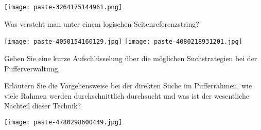 \documentclass{article}
\begin{document}
\begin{tcolorbox}[colback=white!10!white,colframe=lightgray!75!black,
  savelowerto=\jobname_ex.tex]

\begin{center}
\texttt{[image: paste-3264175144961.png]}

\end{center}

\tcblower

\justifying

\end{tcolorbox}
\begin{tcolorbox}[colback=white!10!white,colframe=lightgray!75!black,
  savelowerto=\jobname_ex.tex]

\begin{center}
 Was versteht man unter einem 
logischen
Seitenreferenzstring? 

\end{center}

\tcblower

\justifying
\texttt{[image: paste-4050154160129.jpg]}
\texttt{[image: paste-4080218931201.jpg]}

\end{tcolorbox}
\begin{tcolorbox}[colback=white!10!white,colframe=lightgray!75!black,
  savelowerto=\jobname_ex.tex]

\begin{center}
 Geben Sie eine kurze Aufschlüsselung über die möglichen Suchstrategien bei der 
Pufferverwaltung.
 

\end{center}

\tcblower

\justifying

\end{tcolorbox}
\begin{tcolorbox}[colback=white!10!white,colframe=lightgray!75!black,
  savelowerto=\jobname_ex.tex]

\begin{center}
 Erläutern Sie die 
Vorgehensweise 
bei der direkten Suche im Pufferrahmen, wie viele Rahmen werden durchschnittlich durchsucht und was ist der wesentliche Nachteil dieser Technik? 

\end{center}

\tcblower

\justifying
\texttt{[image: paste-4780298600449.jpg]}

\end{tcolorbox}
\end{document}
